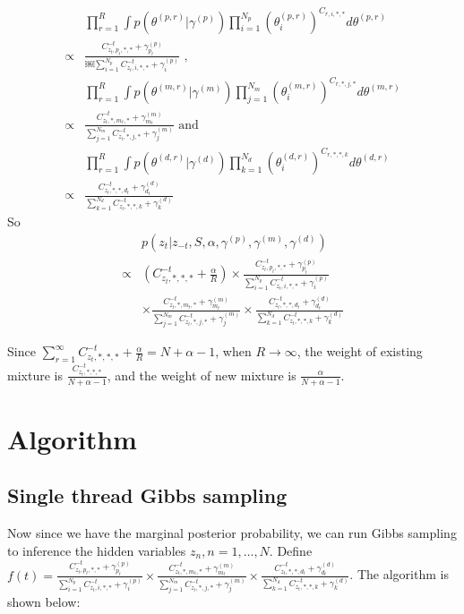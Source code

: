 \documentclass[conference]{IEEEtran}
\begin{document}
\begin{align*}
&	\prod_{r=1}^R \int p(\theta^{(p, r)} | \gamma^{(p)}) \prod_{i=1}^{N_p} (\theta_i^{(p, r)})^{C_{r, i, *, *}} d\theta^{(p, r)} \\
\propto & \frac{C_{z_t, p_t, *, *}^{-t} + \gamma_{p_t}^{(p)}}{￼\sum_{i=1}^{N_p}C_{z_t, i, *, *}^{-t} + \gamma_{i}^{(p)}} \text{ ,}\\
&	\prod_{r=1}^R \int p(\theta^{(m, r)} | \gamma^{(m)}) \prod_{j=1}^{N_m} (\theta_i^{(m, r)})^{C_{r, *, j, *}} d\theta^{(m, r)} \\
\propto & \frac{C_{z_t, *, m_t, *}^{-t} + \gamma_{m_t}^{(m)}}{\sum_{j=1}^{N_m}C_{z_t, *, j, *}^{-t} + \gamma_{j}^{(m)}} \text{ and}\\
&	\prod_{r=1}^R \int p(\theta^{(d, r)} | \gamma^{(d)}) \prod_{k=1}^{N_d} (\theta_i^{(d, r)})^{C_{r, *, *, k}} d\theta^{(d, r)} \\
\propto & \frac{C_{z_t, *, *, d_t}^{-t} + \gamma_{d_t}^{(d)}}{\sum_{k=1}^{N_d}C_{z_t, *, *, k}^{-t} + \gamma_{k}^{(d)}}
\end{align*}
So 
\begin{align*}
&  	p(z_t | z_{-t}, S, \alpha, \gamma^{(p)}, \gamma^{(m)}, \gamma^{(d)}) \\
\propto & (C_{z_t, *, *, *}^{-t} + \frac{\alpha}{R})
\times \frac{C_{z_t, p_t, *, *}^{-t} + \gamma_{p_t}^{(p)}}{\sum_{i=1}^{N_p}C_{z_t, i, *, *}^{-t} + \gamma_{i}^{(p)}} \\
& \times \frac{C_{z_t, *, m_t, *}^{-t} + \gamma_{m_t}^{(m)}}{\sum_{j=1}^{N_m}C_{z_t, *, j, *}^{-t} + \gamma_{j}^{(m)}} 
\times \frac{C_{z_t, *, *, d_t}^{-t} + \gamma_{d_t}^{(d)}}{\sum_{k=1}^{N_d}C_{z_t, *, *, k}^{-t} + \gamma_{k}^{(d)}}
\end{align*}

Since $\sum_{r=1}^{\infty} C_{z_t, *, *, *}^{-t} + \frac{\alpha}{R} = N + \alpha - 1$, when $R \rightarrow \infty$, the weight of existing mixture is $\frac{C_{z_t, *, *, *}^{-t}}{N + \alpha - 1}$, and the weight of new mixture is $\frac{\alpha}{N + \alpha - 1}$. 

\section{Algorithm}

\subsection{Single thread Gibbs sampling}

Now since we have the marginal posterior probability, we can run Gibbs sampling to inference the hidden variables $z_n, n = 1, \ldots, N$. Define $f(t) = \frac{C_{z_t, p_t, *, *}^{-t} + \gamma_{p_t}^{(p)}}{\sum_{i=1}^{N_p}C_{z_t, i, *, *}^{-t} + \gamma_{i}^{(p)}} 
 \times \frac{C_{z_t, *, m_t, *}^{-t} + \gamma_{m_t}^{(m)}}{\sum_{j=1}^{N_m}C_{z_t, *, j, *}^{-t} + \gamma_{j}^{(m)}} 
\times \frac{C_{z_t, *, *, d_t}^{-t} + \gamma_{d_t}^{(d)}}{\sum_{k=1}^{N_d}C_{z_t, *, *, k}^{-t} + \gamma_{k}^{(d)}}$. The algorithm is shown below: 
	
\end{document}
